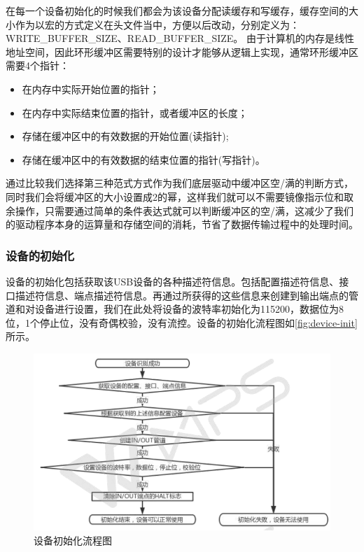 	在每一个设备初始化的时候我们都会为该设备分配读缓存和写缓存，缓存空间的大小作为以宏的方式定义在头文件当中，方便以后改动，分别定义为：WRITE_BUFFER_SIZE、READ_BUFFER_SIZE。
	由于计算机的内存是线性地址空间，因此环形缓冲区需要特别的设计才能够从逻辑上实现，通常环形缓冲区需要4个指针：
	 \begin{itemize}
	 \item 在内存中实际开始位置的指针；
	 \item 在内存中实际结束位置的指针，或者缓冲区的长度；
	 \item 存储在缓冲区中的有效数据的开始位置(读指针);
	 \item 存储在缓冲区中的有效数据的结束位置的指针(写指针)。
	 \end{itemize}


通过比较我们选择第三种范式方式作为我们底层驱动中缓冲区空/满的判断方式，同时我们会将缓冲区的大小设置成2的幂，这样我们就可以不需要镜像指示位和取余操作，只需要通过简单的条件表达式就可以判断缓冲区的空/满，这减少了我们的驱动程序本身的运算量和存储空间的消耗，节省了数据传输过程中的处理时间。


\subsubsection{设备的初始化}

	设备的初始化包括获取该USB设备的各种描述符信息。包括配置描述符信息、接口描述符信息、端点描述符信息。再通过所获得的这些信息来创建到输出端点的管道和对设备进行设置，我们在此处将设备的波特率初始化为115200，数据位为8位，1个停止位，没有奇偶校验，没有流控。设备的初始化流程图如\autoref{fig:device-init}所示。
\begin{figure}[!h]
\centering
\includegraphics[width=1.0\textwidth]{./graphics/Dev-Init.pdf}
\caption{设备初始化流程图}\label{fig:device-init}
\end{figure}


